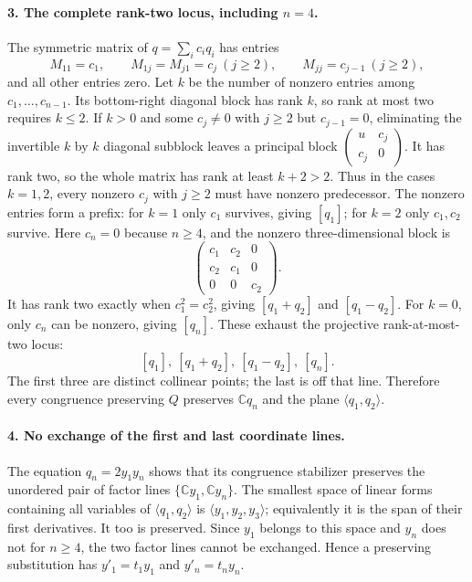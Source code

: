 \paragraph{3. The complete rank-two locus, including $n=4$.}
The symmetric matrix of $q=\sum_i c_iq_i$ has entries
\[
 M_{11}=c_1,\qquad M_{1j}=M_{j1}=c_j\ (j\ge2),\qquad
 M_{jj}=c_{j-1}\ (j\ge2),
\]
and all other entries zero.  Let $k$ be the number of nonzero
entries among $c_1,\ldots,c_{n-1}$.  Its bottom-right diagonal
block has rank $k$, so rank at most two requires $k\le2$.
If $k>0$ and some $c_j\ne0$ with $j\ge2$ but $c_{j-1}=0$,
eliminating the invertible $k$ by $k$ diagonal subblock leaves
a principal block $\left(\begin{smallmatrix}u&c_j\\c_j&0\end{smallmatrix}\right)$.
It has rank two, so the whole matrix has rank at least $k+2>2$.
Thus in the cases $k=1,2$, every nonzero $c_j$ with $j\ge2$
must have nonzero predecessor.  The nonzero entries form a prefix:
for $k=1$ only $c_1$ survives, giving $[q_1]$; for $k=2$ only
$c_1,c_2$ survive.  Here $c_n=0$ because $n\ge4$, and the
nonzero three-dimensional block is
\[
 \begin{pmatrix}c_1&c_2&0\\c_2&c_1&0\\0&0&c_2\end{pmatrix}.
\]
It has rank two exactly when $c_1^2=c_2^2$, giving
$[q_1+q_2]$ and $[q_1-q_2]$.
For $k=0$, only $c_n$ can be nonzero, giving $[q_n]$.
These exhaust the projective rank-at-most-two locus:
\[
                 [q_1],\ [q_1+q_2],\ [q_1-q_2],\ [q_n]. \tag{P-F65d}
\]
The first three are distinct collinear points; the last is off
that line.  Therefore every congruence preserving $Q$ preserves
$\mathbb Cq_n$ and the plane $\langle q_1,q_2\rangle$.

\paragraph{4. No exchange of the first and last coordinate lines.}
The equation $q_n=2y_1y_n$ shows that its congruence stabilizer
preserves the unordered pair of factor lines
$\{\mathbb Cy_1,\mathbb Cy_n\}$.
The smallest space of linear forms containing all variables of
$\langle q_1,q_2\rangle$ is $\langle y_1,y_2,y_3\rangle$;
equivalently it is the span of their first derivatives.  It too
is preserved.  Since $y_1$ belongs to this space and $y_n$ does
not for $n\ge4$, the two factor lines cannot be exchanged.
Hence a preserving substitution has $y'_1=t_1y_1$ and
$y'_n=t_ny_n$.


